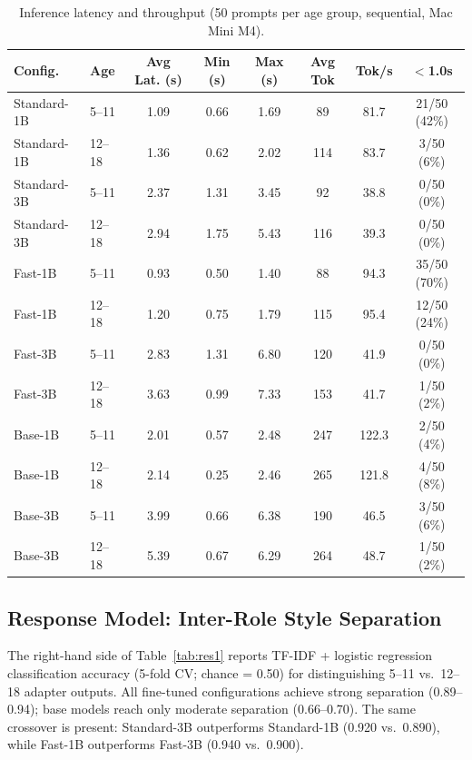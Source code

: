 \documentclass[pdflatex,sn-mathphys-num]{sn-jnl}%
\begin{document}
\begin{table}[!h]
  \caption{Inference latency and throughput (50 prompts per age group, sequential, Mac Mini M4).}
  \label{tab:res3}
  \scriptsize
  \setlength{\tabcolsep}{3pt}
  \begin{tabular}{@{}llcccccc@{}}
    \toprule
    Config. & Age & Avg Lat. (s) & Min (s) & Max (s) & Avg Tok & Tok/s & $<$1.0s \\
    \midrule
    Standard-1B & 5--11  & 1.09 & 0.66 & 1.69 & 89  & 81.7  & 21/50 (42\%) \\
    Standard-1B & 12--18 & 1.36 & 0.62 & 2.02 & 114 & 83.7  & 3/50 (6\%)   \\
    Standard-3B & 5--11  & 2.37 & 1.31 & 3.45 & 92  & 38.8  & 0/50 (0\%)   \\
    Standard-3B & 12--18 & 2.94 & 1.75 & 5.43 & 116 & 39.3  & 0/50 (0\%)   \\
    Fast-1B     & 5--11  & 0.93 & 0.50 & 1.40 & 88  & 94.3  & 35/50 (70\%) \\
    Fast-1B     & 12--18 & 1.20 & 0.75 & 1.79 & 115 & 95.4  & 12/50 (24\%) \\
    Fast-3B     & 5--11  & 2.83 & 1.31 & 6.80 & 120 & 41.9  & 0/50 (0\%)   \\
    Fast-3B     & 12--18 & 3.63 & 0.99 & 7.33 & 153 & 41.7  & 1/50 (2\%)   \\
    Base-1B     & 5--11  & 2.01 & 0.57 & 2.48 & 247 & 122.3 & 2/50 (4\%)   \\
    Base-1B     & 12--18 & 2.14 & 0.25 & 2.46 & 265 & 121.8 & 4/50 (8\%)   \\
    Base-3B     & 5--11  & 3.99 & 0.66 & 6.38 & 190 & 46.5  & 3/50 (6\%)   \\
    Base-3B     & 12--18 & 5.39 & 0.67 & 6.29 & 264 & 48.7  & 1/50 (2\%)   \\
    \bottomrule
  \end{tabular}
\end{table}

\subsection{Response Model: Inter-Role Style Separation}

The right-hand side of Table~\ref{tab:res1} reports TF-IDF + logistic regression classification accuracy (5-fold CV; chance = 0.50) for distinguishing 5--11 vs.\ 12--18 adapter outputs. All fine-tuned configurations achieve strong separation (0.89--0.94); base models reach only moderate separation (0.66--0.70). The same crossover is present: Standard-3B outperforms Standard-1B (0.920 vs.\ 0.890), while Fast-1B outperforms Fast-3B (0.940 vs.\ 0.900).
\end{document}
